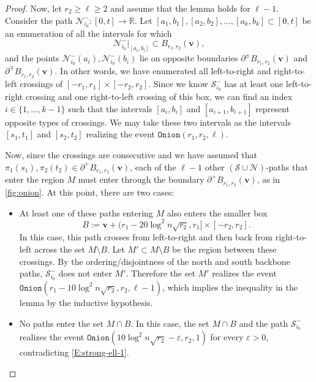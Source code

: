 \documentclass[11pt,twoside]{amsart}
\theoremstyle{plain}
\numberwithin{quest}{section}
\theoremstyle{remark}
\numberwithin{rem}{section}
\theoremstyle{definition}
\newcommand{\eps}{\varepsilon}
\newcommand{\R}{\mathbb{R}}
\newcommand{\cS}{\mathcal{S}}
\newcommand{\cN}{\mathcal{N}}
\renewcommand{\tt}[1]{{\mathtt{#1}}}
\begin{document}
\begin{proof}
		
		Now, let $r_2 \ge \ell \ge 2$ and assume that the lemma holds for $\ell - 1$. Consider the path $\cN_{i_0}^-:[0, t] \to \R$. Let $[a_1, b_1], [a_2, b_2], \dots, [a_k, b_k] \subset [0, t]$ be an enumeration of all the intervals for which 
		$$
		\cN_{i_0}^-|_{[a_i, b_i]} \subset B_{r_1, r_2}(\mathbf{v}),
		$$
		and the points $\cN_{i_0}^-(a_i), \cN_{i_0}^-(b_i)$ lie on opposite boundaries $\partial^\pm B_{r_1, r_2}(\mathbf{v})$ and $\partial^\mp B_{r_1, r_2}(\mathbf{v})$. In other words, we have enumerated all left-to-right and right-to-left crossings of $[-r_1, r_1] \times [-r_2, r_2]$. Since we know $\cS_{i_0}^-$ has at least one left-to-right crossing and one right-to-left crossing of this box, we can find an index $i \in \{1, \dots, k-1\}$ such that the intervals $[a_i, b_i]$ and $[a_{i+1}, b_{i+1}]$ represent opposite types of crossings. We may take these two intervals as the intervals $[s_1, t_1]$ and $[s_2, t_2]$ realizing the event $\tt{Onion}(r_1, r_2, \ell)$.
		
		Now, since the crossings are consecutive and we have assumed that $
		\pi_1(s_1), \pi_2(t_2) \in \partial^+ B_{r_1, r_2}(\mathbf{v})$, each of the $\ell - 1$ other $(\cS \cup \cN)$-paths that enter the region $M$ must enter through the boundary $\partial^+ B_{r_1, r_2}(\mathbf{v})$, as in \cref{fig:onion}. At this point, there are two cases:
		\begin{itemize}[nosep]
			\item At least one of these paths entering $M$ also enters the smaller box 
			$$
			B := \mathbf{v} + (r_1 - 20 \log^2 n \sqrt{r_2}, r_1] \times [-r_2, r_2].
			$$ In this case, this path crosses from left-to-right and then back from right-to-left across the set $M \setminus B$. Let $M' \subset M \setminus B$ be the region between these crossings. By the ordering/disjointness of the north and south backbone paths, $\cS_{i_0}^-$ does not enter $M'$. Therefore the set $M'$ realizes the event $\tt{Onion}(r_1 - 10 \log^2 n \sqrt{r_2}, r_2, \ell - 1)$, which implies the inequality in the lemma by the inductive hypothesis.
			\item No paths enter the set $M \cap B$. In this case, the set $M \cap B$ and the path $\cS_{i_0}^-$ realizes the event $\tt{Onion}(10 \log^2 n \sqrt{r_2} -\eps, r_2, 1)$ for every $\eps > 0$, contradicting \eqref{E:strong-ell-1}. \qedhere
		\end{itemize}
	\end{proof}
	
\end{document}
